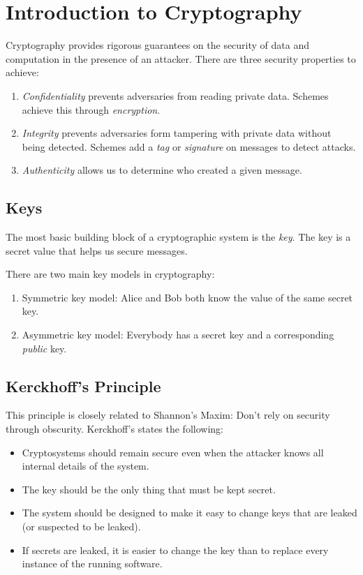 \chapter{Introduction to Cryptography}

Cryptography provides rigorous guarantees on the security of data and computation in the presence of an attacker. There are three security properties to achieve:

\begin{enumerate}
    \item \emph{Confidentiality} prevents adversaries from reading private data. Schemes achieve this through \emph{encryption}.
    \item \emph{Integrity} prevents adversaries form tampering with private data without being detected. Schemes add a \emph{tag} or \emph{signature} on messages to detect attacks.
    \item \emph{Authenticity} allows us to determine who created a given message. 
\end{enumerate}

\section{Keys}
The most basic building block of a cryptographic system is the \emph{key}. The key is a secret value that helps us secure messages. 

\medskip

There are two main key models in cryptography:
\begin{enumerate}
    \item Symmetric key model: Alice and Bob both know the value of the same secret key.
    
    \item Asymmetric key model: Everybody has a secret key and a corresponding \emph{public} key.
\end{enumerate}

\section{Kerckhoff’s Principle}
This principle is closely related to Shannon’s Maxim: Don’t rely on security through obscurity. Kerckhoff's states the following:
\begin{itemize}
    \item Cryptosystems should remain secure even when the attacker knows all internal details of the system. 
    \item The key should be the only thing that must be kept secret.
    \item The system should be designed to make it easy to change keys that are leaked (or suspected to be leaked).
    \item  If secrets are leaked, it is easier to change the key than to replace every instance of the running software. 
\end{itemize}

